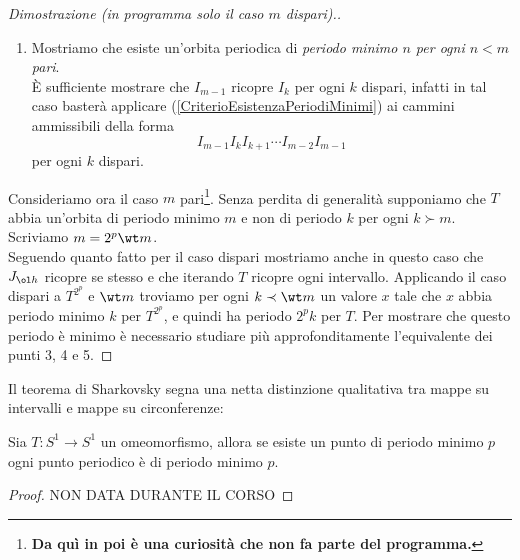 \begin{proof}[Dimostrazione (in programma solo il caso $m$ dispari).]
\begin{enumerate}
\item Mostriamo che esiste un'orbita periodica di \textit{periodo minimo $n$ per ogni $n<m$ pari}.\\
\`E sufficiente mostrare che $I_{m-1}$ ricopre $I_k$ per ogni $k$ dispari, infatti in tal caso baster\`a applicare (\ref{CriterioEsistenzaPeriodiMinimi}) ai cammini ammissibili della forma
\[I_{m-1}I_k I_{k+1}\cdots I_{m-2}I_{m-1}\]
per ogni $k$ dispari.
\end{enumerate}
Consideriamo ora il caso $m$ pari\footnote{\textbf{Da qu\`i in poi \`e una curiosit\`a che non fa parte del programma.}}.
Senza perdita di generalit\`a supponiamo che $T$ abbia un'orbita di periodo minimo $m$ e non di periodo $k$ per ogni $k\succ m$. Scriviamo $m=2^p\wt m$.\\
Seguendo quanto fatto per il caso dispari mostriamo anche in questo caso che $J_{\ol h}$ ricopre se stesso e che iterando $T$ ricopre ogni intervallo. Applicando il caso dispari a $T^{2^p}$ e $\wt m$ troviamo per ogni $k\prec \wt m$ un valore $x$ tale che $x$ abbia periodo minimo $k$ per $T^{2^p}$, e quindi ha periodo $2^pk$ per $T$. Per mostrare che questo periodo \`e minimo \`e necessario studiare pi\`u approfonditamente l'equivalente dei punti 3, 4 e 5.
\end{proof}

Il teorema di Sharkovsky segna una netta distinzione qualitativa tra mappe su intervalli e mappe su circonferenze:

\begin{proposition}
Sia $T:S^1\to S^1$ un omeomorfismo, allora se esiste un punto di periodo minimo $p$ ogni punto periodico \`e di periodo minimo $p$.
\end{proposition}
\begin{proof}
NON DATA DURANTE IL CORSO
\end{proof}